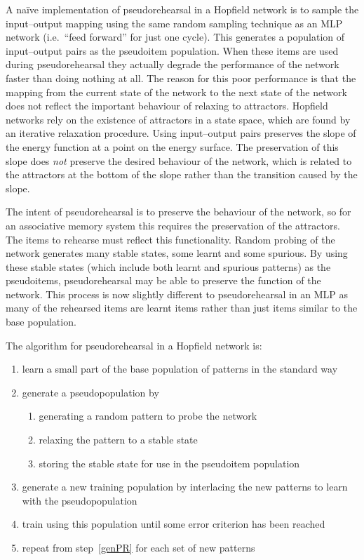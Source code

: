 A na\"{i}ve implementation of pseudorehearsal in a Hopfield network is to sample the input--output mapping using the same random sampling technique as an MLP network (i.e.\ ``feed forward'' for just one cycle).  This generates a population of input--output pairs as the pseudoitem population.  When these items are used during pseudorehearsal they actually degrade the performance of the network faster than doing nothing at all.  The reason for this poor performance is that the mapping from the current state of the network to the next state of the network does not reflect the important behaviour of relaxing to attractors. Hopfield networks rely on the existence of attractors in a state space, which are found by an iterative relaxation procedure.  Using input--output pairs preserves the slope of the energy function at a point on the energy surface.  The preservation of this slope does \emph{not} preserve the desired behaviour of the network, which is related to the attractors at the bottom of the slope rather than the transition caused by the slope.

The intent of pseudorehearsal is to preserve the behaviour of the network, so for an associative memory system this requires the preservation of the attractors.  The items to rehearse must reflect this functionality.  Random probing of the network generates many stable states, some learnt and some spurious.  By using these stable states (which include both learnt and spurious patterns) as the pseudoitems, pseudorehearsal may be able to preserve the function of the network.  This process is now slightly different to pseudorehearsal in an MLP as many of the rehearsed items are learnt items rather than just items similar to the base population.

The algorithm for pseudorehearsal in a Hopfield network is:
\begin{enumerate}
\item learn a small part of the base population of patterns in the standard way
\label{initlearn}
\item generate a pseudopopulation by
\label{genPR}
	\begin{enumerate}
		\item generating a random pattern to probe the network
		\label{generate}
		\item relaxing the pattern to a stable state
		\label{relax}
		\item storing the stable state for use in the pseudoitem population
		\label{storepseudo}
	\end{enumerate}
\item generate a new training population by interlacing the new patterns to learn with the pseudopopulation
\label{genpop}
\item train using this population until some error criterion has been reached
\label{errorcrit}
\item repeat from step~\ref{genPR} for each set of new patterns 
\end{enumerate}
 
